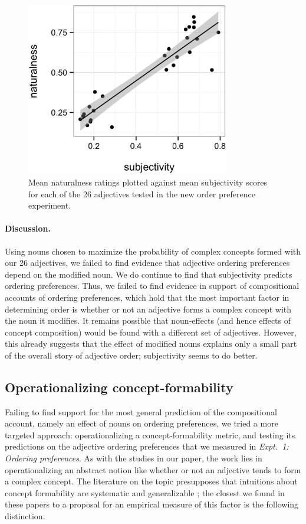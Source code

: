 \documentclass[12pt]{article}
\begin{document}
\renewcommand\thefigure{S.\arabic{figure}}
\begin{figure}
	\centering\includegraphics[width=3.5in]{plots/naturalness-subjectivity-new-nouns.eps}
	\caption{Mean naturalness ratings plotted against mean subjectivity scores for each of the 26 adjectives tested in the new order preference experiment.}\label{fig:subjectivity}
\end{figure}

\paragraph{Discussion.} Using nouns chosen to maximize the probability of complex concepts formed with our 26 adjectives, we failed to find evidence that adjective ordering preferences depend on the modified noun. We do continue to find that subjectivity predicts ordering preferences. Thus, we failed to find evidence in support of compositional accounts of ordering preferences, which hold that the most important factor in determining order is whether or not an adjective forms a complex concept with the noun it modifies. 
It remains possible that noun-effects (and hence effects of concept composition) would be found with a different set of adjectives. 
However, this already suggests that the effect of modified nouns explains only a small part of the overall story of adjective order; subjectivity seems to do better.



\subsection{Operationalizing concept-formability}

Failing to find support for the most general prediction of the compositional account, namely an effect of nouns on ordering preferences, we tried a more targeted approach: operationalizing a concept-formability metric, and testing its predictions on the adjective ordering preferences that we measured in \emph{Expt.~1: Ordering preferences}. As with the studies in our paper, the work lies in operationalizing an abstract notion like whether or not an adjective tends to form a complex concept. The literature on the topic presupposes that intuitions about concept formability are systematic and generalizable \citep{McNally2004,svenonius2008}; the closest we found in these papers to a proposal for an empirical measure of this factor is the following distinction.
\end{document}
